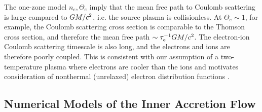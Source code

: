 The one-zone model $n_e, \Theta_e$ imply that the mean free path to Coulomb scattering is large compared to $GM/c^2$, i.e. the source plasma is collisionless.
At $\Theta_e \sim 1$, for example, the Coulomb scattering cross section is comparable to the Thomson cross section, and therefore the mean free path $\sim \tau_e^{-1} GM/c^2$.
The electron-ion Coulomb scattering timescale is also long, and the electrons and ions are therefore poorly coupled.
This is consistent with our assumption of a two-temperature  plasma where electrons are cooler than the ions \citep{1976ApJ...204..187S,1977ApJ...214..840I, 1982Natur.295...17R} and motivates consideration of
nonthermal (unrelaxed) electron distribution functions \citep[see][]{2000ApJ...541..234O, 2009ApJ...701..521C, 2014A&A...570A...7M, 2018A&A...612A..34D, 2021arXiv211102518F, 2021NatAs.tmp..218C, Chatterjee2021, 2021arXiv211203933E, Scepi2021}.

\subsection{Numerical Models of the Inner Accretion Flow}

